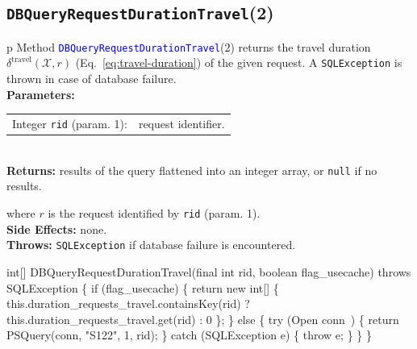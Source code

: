 \subsection{\texttt{DBQueryRequestDurationTravel}(2)}
\begin{tabular}{p{\textwidth}}
\toprule
{}
Method \textcolor{blue}{{\tt{}\protect{}DBQueryRequestDurationTravel}}(2) returns the
travel duration $\delta^\textrm{travel}(\mathcal{X},r)$
(Eq.~\ref{eq:travel-duration}) of the given request.
A {\tt{}SQLException} is thrown in case of database failure.\\
\midrule
\textbf{Parameters:}\\
\begin{tabular}{lp{116mm}}
Integer {\tt{}rid} (param. 1):&request identifier.
\end{tabular}\\
\textbf{Returns:} results of the query flattened into an integer array,
or {\tt{}null} if no results.


where $r$ is the request identified by {\tt{}rid} (param. 1).\\
\textbf{Side Effects:} none.\\
\textbf{Throws:} {\tt{}SQLException} if database failure is encountered.\\
\bottomrule
\end{tabular}
\nwenddocs{}\endmoddef{}
int[] DBQueryRequestDurationTravel(final int rid, boolean flag_usecache) throws SQLException \{
  if (flag_usecache) \{
    return new int[] \{ this.duration_requests_travel.containsKey(rid)
        ? this.duration_requests_travel.get(rid)
        : 0 \};
  \} else \{
    try (\LA{}Open \code{}conn\edoc{}~{\nwtagstyle{}}\RA{}) \{
      return PSQuery(conn, "S122", 1, rid);
    \} catch (SQLException e) \{
      throw e;
    \}
  \}
\}
\eatline
{}\nwendcode{}\nwdocspar

